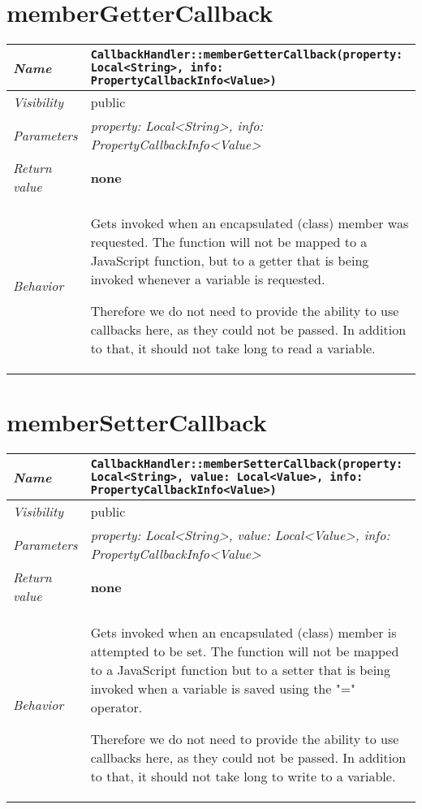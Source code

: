 \section{memberGetterCallback}
\begin{longtable}{p{3cm} @{\hskip 1cm} p{12cm}}
 \hline
\textit{Name} & \texttt{CallbackHandler::memberGetterCallback(property: Local<String>, info: PropertyCallbackInfo<Value>)}\\
\hline
 \textit{Visibility} & public\\
\hline
\textit{Parameters} & \textit{property: Local<String>, info: PropertyCallbackInfo<Value>}\\
\hline
\textit{Return value} & \textbf{none}\\
  \hline
 \textit{Behavior} & Gets invoked when an encapsulated (class) member was requested. The function will not be mapped to a JavaScript function, but to a getter that is being invoked whenever a variable is requested.

 Therefore we do not need to provide the ability to use callbacks here, as they could not be passed. In addition to that, it should not take long to read a variable. \\
\hline
\end{longtable}
 \section{memberSetterCallback}
\begin{longtable}{p{3cm} @{\hskip 1cm} p{12cm}}
 \hline
\textit{Name} & \texttt{CallbackHandler::memberSetterCallback(property: Local<String>, value: Local<Value>, info: PropertyCallbackInfo<Value>)}\\
\hline
 \textit{Visibility} & public\\
\hline
\textit{Parameters} & \textit{property: Local<String>, value: Local<Value>, info: PropertyCallbackInfo<Value>}\\
\hline
\textit{Return value} & \textbf{none}\\
  \hline
 \textit{Behavior} & Gets invoked when an encapsulated (class) member is attempted to be set. The function will not be mapped to a JavaScript function but to a setter that is being invoked when a variable is saved using the "=" operator.

 Therefore we do not need to provide the ability to use callbacks here, as they could not be passed. In addition to that, it should not take long to write to a variable. \\
\hline
\end{longtable}
